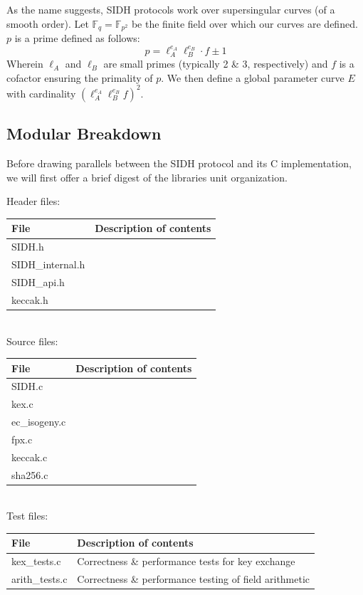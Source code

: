 As the name suggests, SIDH protocols work over supersingular curves (of a smooth order). Let $\mathbb{F}_q = \mathbb{F}_{p^2}$ be the finite field over which our curves are defined. $p$ is a prime defined as follows:
$$
p = \ell_{A}^{e_A}\ell_{B}^{e_B} \cdot f \pm 1
$$
Wherein $\ell_{A}$ and $\ell_{B}$ are small primes (typically 2 \& 3, respectively) and $f$ is a cofactor ensuring the primality of $p$. We then define a global parameter curve $E$ with cardinality $(\ell_{A}^{e_A}\ell_{B}^{e_B}f)^2$.

\subsection{Modular Breakdown}

Before drawing parallels between the SIDH protocol and its C implementation, we will first offer a brief digest of the libraries unit organization.\\

\begin{center}
Header files:\\
	\begin{tabular}{@{}ll@{}}
		File & Description of contents\\
		\toprule
		SIDH.h & \\
		\midrule
		SIDH\_internal.h & \\
		\midrule
		SIDH\_api.h & \\
		\midrule
		keccak.h & \\
		\bottomrule
	\end{tabular}\\
	
Source files:\\
	\begin{tabular}{@{}ll@{}}
		File & Description of contents\\
		\toprule
		SIDH.c & \\
		\midrule
		kex.c & \\
		\midrule
		ec\_isogeny.c & \\
		\midrule
		fpx.c & \\
		\midrule
		keccak.c & \\
		\midrule
		sha256.c & \\
		\bottomrule
	\end{tabular}\\
	
Test files:\\
	\begin{tabular}{@{}ll@{}}
		File & Description of contents\\
		\toprule
		kex\_tests.c & Correctness \& performance tests for key exchange\\
		\midrule
		arith\_tests.c & Correctness \& performance testing of field arithmetic\\
		\bottomrule
	\end{tabular}
\end{center}

